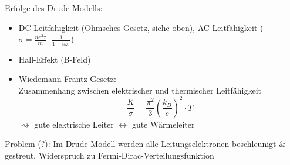 \begin{itemize}
    Erfolge des Drude-Modells:
    \begin{itemize}
        \item DC Leitfähigkeit (Ohmsches Gesetz, siehe oben), AC Leitfähigkeit ($\sigma = \frac{n e^2 \tau}{m} \cdot \frac{1}{1-i\omega \tau}$)
        \item Hall-Effekt (B-Feld)
        \item Wiedemann-Frantz-Gesetz:\\
        Zusammenhang zwischen elektrischer und thermischer Leitfähigkeit $$\frac{K}{\sigma} = \frac{\pi^2}{3} \left(\frac{k_B}{e}\right)^2 \cdot T$$
        $\rightsquigarrow$ gute elektrische Leiter $\leftrightarrow$ gute Wärmeleiter
    \end{itemize}
    Problem (?): Im Drude Modell werden alle Leitungselektronen beschleunigt \& gestreut. Widerspruch zu Fermi-Dirac-Verteilungsfunktion


\end{itemize}
